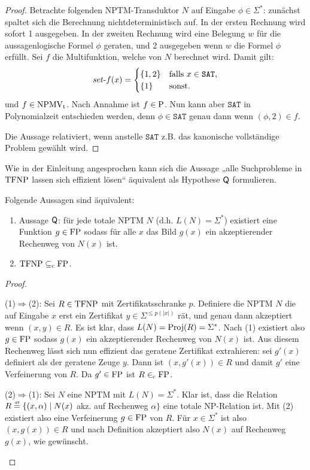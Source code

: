 \begin{proof}
    Betrachte folgenden NPTM-Transduktor $N$ auf Eingabe $\phi\in\Sigma^*$: zunächst spaltet sich die Berechnung nichtdeterministisch auf. In der ersten Rechnung wird sofort 1 ausgegeben. In der zweiten Rechnung wird eine Belegung $w$ für die aussagenlogische Formel $\phi$ geraten, und 2 ausgegeben wenn $w$ die Formel $\phi$ erfüllt. Sei $f$ die Multifunktion, welche von $N$ berechnet wird.
    Damit gilt:
    \[ \fset{}f(x) = \begin{cases} \{ 1, 2\} & \text{falls $x\in\mathtt{SAT}$,} \\ \{ 1\} & \text{sonst. } \end{cases} \]
    und $f\in\NPMVt$.
    Nach Annahme ist $f\in \P$. Nun kann aber $\mathtt{SAT}$ in Polynomialzeit entschieden werden, denn $\phi\in\mathtt{SAT}$ genau dann wenn $(\phi, 2) \in f$.

    Die Aussage relativiert, wenn anstelle $\mathtt{SAT}$ z.B. das kanonische vollständige Problem gewählt wird.
\end{proof}
Wie in der Einleitung angesprochen kann sich die Aussage „alle Suchprobleme in $\TFNP$ lassen sich effizient lösen“ äquivalent als Hypothese $\hQ$ formulieren.
\begin{observation}\label{obs:tfnp-q}
    Folgende Aussagen sind äquivalent:
    \begin{enumerate}
        \item Aussage $\hQ$: für jede totale NPTM $N$ (d.h. $L(N)=\Sigma^*$) existiert eine Funktion $g\in\FP$ sodass für alle $x$ das Bild $g(x)$ ein akzeptierender Rechenweg von $N(x)$ ist. 
        \item $\TFNP\subseteqc \FP$.
    \end{enumerate}
\end{observation}
\begin{proof}
\begin{prooflist}
\item (1)$\Rightarrow$(2): Sei $R\in\TFNP$ mit Zertifikatsschranke $p$. Definiere die NPTM $N$ die auf Eingabe $x$ erst ein Zertifikat $y\in\Sigma^{\leq p(|x|)}$ rät, und genau dann akzeptiert wenn $(x,y)\in R$. Es ist klar, dass $L(N)=\Proj(R)=\Sigma^*$. Nach (1) existiert also $g\in\FP$ sodass $g(x)$ ein akzeptierender Rechenweg von $N(x)$ ist. Aus diesem Rechenweg lässt sich nun effizient das geratene Zertifikat extrahieren: sei $g'(x)$ definiert als der geratene Zeuge $y$. Dann ist $(x,g'(x))\in R$ und damit $g'$ eine Verfeinerung von $R$. Da $g'\in\FP$ ist $R\inc\FP$.

\item (2)$\Rightarrow$(1): Sei $N$ eine NPTM mit $L(N)=\Sigma^*$. Klar ist, dass die Relation $R\defeq \{ (x,\alpha) \mid N(x)$ akz. auf Rechenweg $\alpha\}$ eine totale NP-Relation ist.
    Mit (2) existiert also eine Verfeinerung $g\in\FP$ von $R$. Für $x\in\Sigma^*$ ist also $(x, g(x))\in R$ und nach Definition akzeptiert also $N(x)$ auf Rechenweg $g(x)$, wie gewünscht.
\end{prooflist}
\end{proof}

